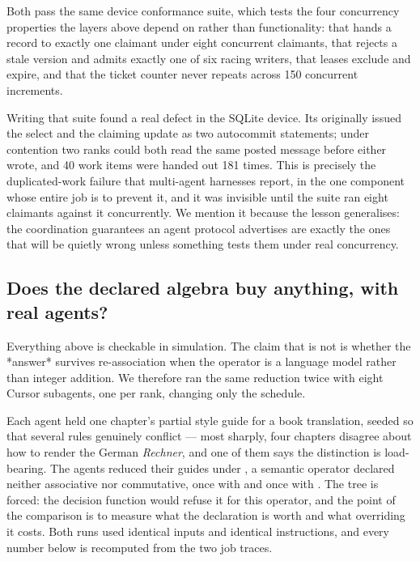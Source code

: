 Both pass the same device conformance suite, which tests the four concurrency
properties the layers above depend on rather than functionality: that
 hands a record to exactly one claimant under eight concurrent
claimants, that  rejects a stale version and admits exactly one of
six racing writers, that leases exclude and expire, and that the ticket counter
never repeats across 150 concurrent increments.

Writing that suite found a real defect in the SQLite device.  Its 
originally issued the select and the claiming update as two autocommit
statements; under contention two ranks could both read the same posted message
before either wrote, and 40 work items were handed out 181 times.  This is
precisely the duplicated-work failure that multi-agent harnesses report, in the
one component whose entire job is to prevent it, and it was invisible until the
suite ran eight claimants against it concurrently.  We mention it because the
lesson generalises: the coordination guarantees an agent protocol advertises
are exactly the ones that will be quietly wrong unless something tests them
under real concurrency.

\subsection{Does the declared algebra buy anything, with real agents?}
\label{sec:eval-semantic}

Everything above is checkable in simulation.  The claim that is not is whether
the *answer* survives re-association when the operator is a language model
rather than integer addition.  We therefore ran the same reduction twice with
eight Cursor subagents, one per rank, changing only the schedule.

Each agent held one chapter's partial style guide for a book translation,
seeded so that several rules genuinely conflict --- most sharply, four chapters
disagree about how to render the German \emph{Rechner}, and one of them says
the distinction is load-bearing.  The agents reduced their guides under
, a semantic operator declared neither associative nor
commutative, once with  and once with
.  The tree is forced: the decision function would refuse
it for this operator, and the point of the comparison is to measure what the
declaration is worth and what overriding it costs.  Both runs used identical
inputs and identical instructions, and every number below is recomputed from
the two job traces.

